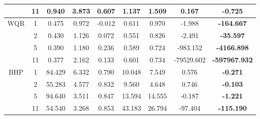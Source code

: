 \begin{table}[]
{\begin{tabular}{|c|c|ccc|ccc|c|}
                          & 11                     & \multicolumn{1}{c|}{0.940}  & \multicolumn{1}{c|}{3.873} & 0.607  & \multicolumn{1}{c|}{1.137}  & \multicolumn{1}{c|}{1.509}  & 0.167      & \textbf{-0.725}                       \\ \hline
\multirow{4}{*}{WQR}      & 1                      & \multicolumn{1}{c|}{0.475}  & \multicolumn{1}{c|}{0.972} & -0.012 & \multicolumn{1}{c|}{0.611}  & \multicolumn{1}{c|}{0.970}  & -1.988     & \textbf{-164.667}                      \\ \cline{2-9} 
                          & 2                      & \multicolumn{1}{c|}{0.430}  & \multicolumn{1}{c|}{1.126} & 0.072  & \multicolumn{1}{c|}{0.551}  & \multicolumn{1}{c|}{0.826}  & -2.491     & \textbf{-35.597}                      \\ \cline{2-9} 
                          & 5                      & \multicolumn{1}{c|}{0.390}  & \multicolumn{1}{c|}{1.180} & 0.236  & \multicolumn{1}{c|}{0.589}  & \multicolumn{1}{c|}{0.724}  & -983.152   & \textbf{-4166.898}                    \\ \cline{2-9} 
                          & 11                     & \multicolumn{1}{c|}{0.377}  & \multicolumn{1}{c|}{2.162} & 0.133  & \multicolumn{1}{c|}{0.601}  & \multicolumn{1}{c|}{0.734}  & -79529.602 & \textbf{-597967.932}                  \\ \hline
\multirow{4}{*}{BHP}      & 1                      & \multicolumn{1}{c|}{84.429} & \multicolumn{1}{c|}{6.332} & 0.790  & \multicolumn{1}{c|}{10.048} & \multicolumn{1}{c|}{7.549}  & 0.576      & \textbf{-0.271}                       \\ \cline{2-9} 
                          & 2                      & \multicolumn{1}{c|}{55.283} & \multicolumn{1}{c|}{4.577} & 0.832  & \multicolumn{1}{c|}{9.560}  & \multicolumn{1}{c|}{4.648}  & 0.746      & \textbf{-0.103}                       \\ \cline{2-9} 
                          & 5                      & \multicolumn{1}{c|}{94.640} & \multicolumn{1}{c|}{3.511} & 0.847  & \multicolumn{1}{c|}{13.594} & \multicolumn{1}{c|}{14.555} & -0.187     & \textbf{-1.221}                       \\ \cline{2-9} 
                          & 11                     & \multicolumn{1}{c|}{54.540} & \multicolumn{1}{c|}{3.268} & 0.853  & \multicolumn{1}{c|}{43.183} & \multicolumn{1}{c|}{26.794} & -97.404    & \textbf{-115.190}                     \\ \hline
\end{tabular}}

\end{table}
